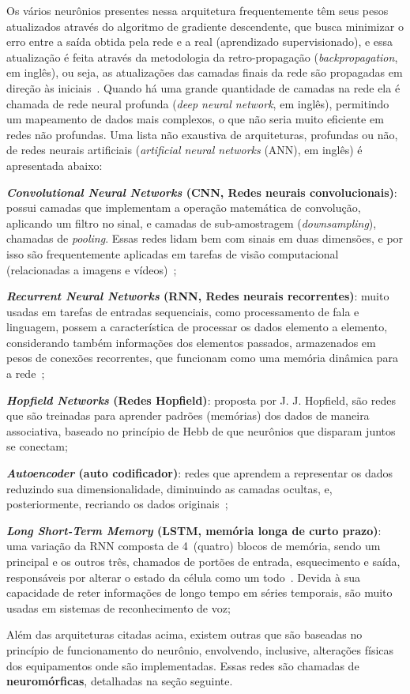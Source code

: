 Os vários neurônios presentes nessa arquitetura frequentemente têm seus pesos atualizados através do algoritmo de gradiente descendente, que busca minimizar o erro entre a saída obtida pela rede e a real (aprendizado supervisionado), e essa atualização é feita através da metodologia da retro-propagação (\textit{backpropagation}, em inglês), ou seja, as atualizações das camadas finais da rede são propagadas em direção às iniciais~\cite{werbos_beyond_1974}. Quando há uma grande quantidade de camadas na rede ela é chamada de rede neural profunda (\textit{deep neural network}, em inglês), permitindo um mapeamento de dados mais complexos, o que não seria muito eficiente em redes não profundas. Uma lista não exaustiva de arquiteturas, profundas ou não, de redes neurais artificiais (\textit{artificial neural networks} (ANN), em inglês) é apresentada abaixo:
\begin{alineas}
	\item \textbf{\textit{Convolutional Neural Networks} (CNN, Redes neurais convolucionais)}: possui camadas que implementam a operação matemática de convolução, aplicando um filtro no sinal, e camadas de sub-amostragem (\textit{downsampling}), chamadas de \textit{pooling}. Essas redes lidam bem com sinais em duas dimensões, e por isso são frequentemente aplicadas em tarefas de visão computacional (relacionadas a imagens e vídeos)~\cite{lecun_gradient-based_1998};
	\item \textbf{\textit{Recurrent Neural Networks} (RNN, Redes neurais recorrentes)}: muito usadas em tarefas de entradas sequenciais, como processamento de fala e linguagem, possem a característica de processar os dados elemento a elemento, considerando também informações dos elementos passados, armazenados em pesos de conexões recorrentes, que funcionam como uma memória dinâmica para a rede~\cite{elman_finding_1990};
	\item \textbf{\textit{Hopfield Networks} (Redes Hopfield)}: proposta por J. J. Hopfield, são redes que são treinadas para aprender padrões (memórias) dos dados de maneira associativa, baseado no princípio de Hebb de que neurônios que disparam juntos se conectam;
	\item \textbf{\textit{Autoencoder} (auto codificador)}: redes que aprendem a representar os dados reduzindo sua dimensionalidade, diminuindo as camadas ocultas, e, posteriormente, recriando os dados originais~\cite{hinton_reducing_2006};
	\item \textbf{\textit{Long Short-Term Memory} (LSTM, memória longa de curto prazo)}: uma variação da RNN composta de 4~(quatro) blocos de memória, sendo um principal e os outros três, chamados de portões de entrada, esquecimento e saída, responsáveis por alterar o estado da célula como um todo~\cite{hochreiter_long_1997}.	Devida à sua capacidade de reter informações de longo tempo em séries temporais, são muito usadas em sistemas de reconhecimento de voz;
\end{alineas}
Além das arquiteturas citadas acima, existem outras que são baseadas no princípio de funcionamento do neurônio, envolvendo, inclusive, alterações físicas dos equipamentos onde são implementadas. Essas redes são chamadas de \textbf{neuromórficas}, detalhadas na seção seguinte.

